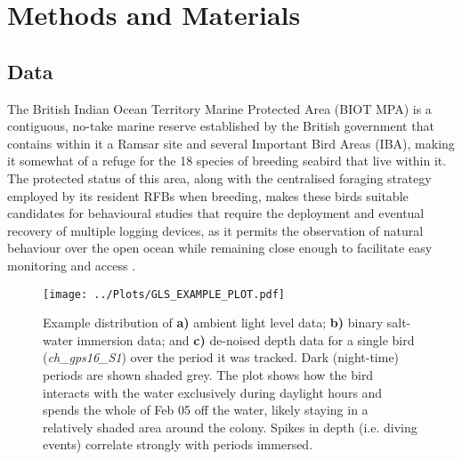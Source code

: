 \documentclass[11pt]{article}
\begin{document}
    
    \section{Methods and Materials}

    \subsection{Data}
    The British Indian Ocean Territory Marine Protected Area (BIOT MPA) is a contiguous, no-take marine reserve established by the British government that contains within it a Ramsar site and several Important Bird Areas (IBA), making it somewhat of a refuge for the 18 species of breeding seabird that live within it. The protected status of this area, along with the centralised foraging strategy employed by its resident RFBs when breeding, makes these birds suitable candidates for behavioural studies that require the deployment and eventual recovery of multiple logging devices, as it permits the observation of natural behaviour over the open ocean while remaining close enough to facilitate easy monitoring and access \citep{einoder2009review}.
    
    \begin{figure}[t!]
	    \centering\texttt{[image: ../Plots/GLS\_EXAMPLE\_PLOT.pdf]}
	    \caption{Example distribution of \textbf{a)} ambient light level data; \textbf{b)} binary salt-water immersion data; and \textbf{c)} de-noised depth data for a single bird (\emph{ch\_gps16\_S1}) over the period it was tracked. Dark (night-time) periods are shown shaded grey. The plot shows how the bird interacts with the water exclusively during daylight hours and spends the whole of Feb 05 off the water, likely staying in a relatively shaded area around the colony. Spikes in depth (i.e. diving events) correlate strongly with periods immersed.}
    \end{figure}
    
\end{document}
